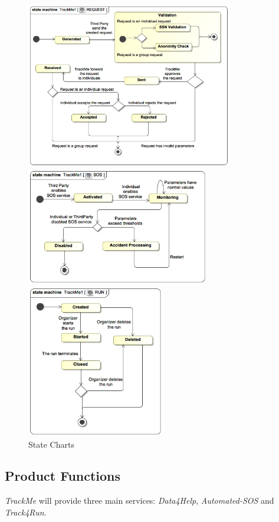 \documentclass[a4paper]{article}
\begin{document}
    \begin{figure}[!htpb]
        \centering
        \includegraphics[width=90mm, keepaspectratio]{images/UML/state_request.jpg}
        \hfill
        
        \centering
        \includegraphics[width=80mm, keepaspectratio]{images/UML/state_sos.jpg}
        \hfill
        
        \centering
        \includegraphics[width=60mm, keepaspectratio]{images/UML/state_run.jpg}
        \caption{State Charts}
    \end{figure}
    
    \newpage
    
    \subsection{Product Functions}
    \textit{TrackMe} will provide three main services: \textit{Data4Help}, \textit{Automated-SOS} and \textit{Track4Run}.
    
\end{document}
